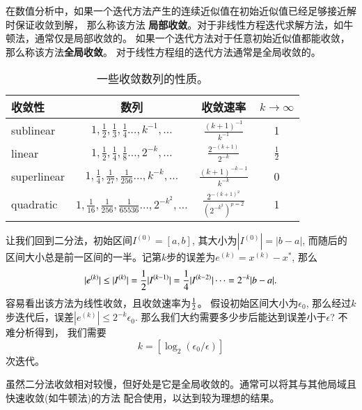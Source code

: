 在数值分析中，如果一个迭代方法产生的连续近似值在初始近似值已经足够接近解时保证收敛到解，
那么称该方法
\textbf{局部收敛}。对于非线性方程迭代求解方法，如牛顿法，通常仅是局部收敛的。
如果一个迭代方法对于任意初始近似值都能收敛，那么称该方法\textbf{全局收敛}。
对于线性方程组的迭代方法通常是全局收敛的。

\begin{table}[ht]
    \centering
    \caption{一些收敛数列的性质。}
    \label{tab:convergent_sequences}
\begin{tabular}{lccc}
    \hline 收敛性 & 数列 & 收敛速率 & $k \rightarrow \infty$ \\
    \hline sublinear & $1, \frac{1}{2}, \frac{1}{3}, \frac{1}{4} \ldots, k^{-1}, \ldots$ & $\frac{(k+1)^{-1}}{k^{-1}}$ & 1 \\
    linear & $1, \frac{1}{2}, \frac{1}{4}, \frac{1}{8} \ldots, 2^{-k}, \ldots$ & $\frac{2^{-(k+1)}}{2^{-k}}$ & $\frac{1}{2}$ \\
    superlinear & $1, \frac{1}{4}, \frac{1}{27}, \frac{1}{256} \ldots, k^{-k}, \ldots$ & $\frac{(k+1)^{-k-1}}{k^{-k}}$ & 0 \\
    quadratic & $1, \frac{1}{16}, \frac{1}{256}, \frac{1}{65536} \ldots, 2^{-k^2}, \ldots$ & $\frac{2^{-(k+1)^2}}{\left(2^{-k^2}\right)^{p=2}}$ & 1 \\
    \hline
\end{tabular}
\end{table}

让我们回到二分法，初始区间$I^{(0)} = [a,b]$, 其大小为$|I^{(0)}| = |b-a|$,
而随后的区间大小总是前一区间的一半。记第$k$步的误差为$e^{(k)} = x^{(k)} - x^*$,
那么
\begin{equation}
    |e^{(k)}| \leq |I^{(k)}| =  {\frac{1}{2}} |I^{(k-1)}| = \frac{1}{4} 
    |I^{(k-2)}| \cdots = 2^{-k} | b-a|.
\end{equation}
容易看出该方法为线性收敛，且收敛速率为${\frac{1}{2}}$。 假设初始区间大小为$\epsilon_0$,
那么经过$k$步迭代后，误差$|e^{(k)}| \leq 2^{-k} \epsilon_0$.
那么我们大约需要多少步后能达到误差小于$\epsilon$?
不难分析得到，
我们需要
$$
 k = [ \log_2 (\epsilon_0/\epsilon)]
$$
次迭代。

虽然二分法收敛相对较慢，但好处是它是全局收敛的。通常可以将其与其他局域且快速收敛(如牛顿法)的方法
配合使用，以达到较为理想的结果。

